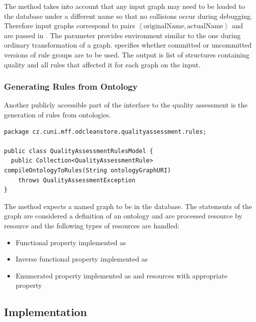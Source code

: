 The method  takes into account that any input graph may need to be loaded to the database under a different name so that no collisions occur during debugging. Therefore input graphs correspond to pairs $ \left< \text{originalName}, \text{actualName} \right> $ and are passed in . The  parameter provides environment similar to the one during ordinary transformation of a graph.  specifies whether committed or uncommitted versions of rule groups are to be used. The output is list of structures containing quality and all rules that affected it for each graph on the input.

\subsubsection*{Generating Rules from Ontology}

Another publicly accessible part of the interface to the quality assessment is the generation of rules from ontologies.

\begin{lstlisting}[caption=Quality Assessment Rule Generation,label=lst:qualityAssessmentRulesModel]
package cz.cuni.mff.odcleanstore.qualityassessment.rules;

public class QualityAssessmentRulesModel {
  public Collection<QualityAssessmentRule> compileOntologyToRules(String ontologyGraphURI)
    throws QualityAssessmentException
}
\end{lstlisting}

The method  expects a named graph  to be in the database. The statements of the graph are considered a definition of an ontology and are processed resource by resource and the following types of resources are handled:

\begin{itemize}
	\item Functional property implemented as 
	\item Inverse functional property implemented as 
	\item Enumerated property implemented as  and resources with appropriate  property
\end{itemize}

\subsection{Implementation}

